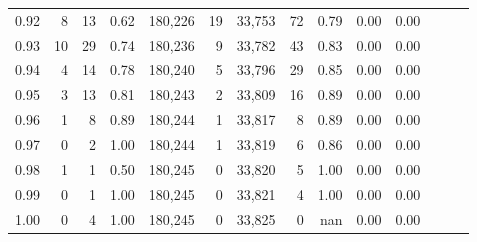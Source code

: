 \begin{tabular}{rrrrrrrrrrrrrr}
0.92 &       8 &   13 &  0.62 &  180,226 &       19 &  33,753 &      72 &  0.79 &  0.00 &      0.00 \\
0.93 &      10 &   29 &  0.74 &  180,236 &        9 &  33,782 &      43 &  0.83 &  0.00 &      0.00 \\
0.94 &       4 &   14 &  0.78 &  180,240 &        5 &  33,796 &      29 &  0.85 &  0.00 &      0.00 \\
0.95 &       3 &   13 &  0.81 &  180,243 &        2 &  33,809 &      16 &  0.89 &  0.00 &      0.00 \\
0.96 &       1 &    8 &  0.89 &  180,244 &        1 &  33,817 &       8 &  0.89 &  0.00 &      0.00 \\
0.97 &       0 &    2 &  1.00 &  180,244 &        1 &  33,819 &       6 &  0.86 &  0.00 &      0.00 \\
0.98 &       1 &    1 &  0.50 &  180,245 &        0 &  33,820 &       5 &  1.00 &  0.00 &      0.00 \\
0.99 &       0 &    1 &  1.00 &  180,245 &        0 &  33,821 &       4 &  1.00 &  0.00 &      0.00 \\
1.00 &       0 &    4 &  1.00 &  180,245 &        0 &  33,825 &       0 &   nan &  0.00 &      0.00 \\
\bottomrule
\end{tabular}
